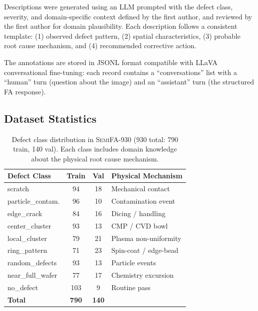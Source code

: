 \documentclass[conference]{IEEEtran}
\newcommand{\semidataset}{\textsc{SemiFA-930}}
\begin{document}
Descriptions were generated using an LLM prompted with the defect class, severity, and domain-specific context defined by the first author, and reviewed by the first author for domain plausibility.
Each description follows a consistent template: (1) observed defect pattern, (2) spatial characteristics, (3) probable root cause mechanism, and (4) recommended corrective action.

The annotations are stored in JSONL format compatible with LLaVA conversational fine-tuning: each record contains a ``conversations'' list with a ``human'' turn (question about the image) and an ``assistant'' turn (the structured FA response).

\subsection{Dataset Statistics}

\begin{table}[t]
    \centering
    \caption{Defect class distribution in \semidataset{} (930 total: 790 train, 140 val). Each class includes domain knowledge about the physical root cause mechanism.}
    \label{tab:defect_classes}
    \begin{tabular}{@{}lccl@{}}
        \toprule
        \textbf{Defect Class} & \textbf{Train} & \textbf{Val} & \textbf{Physical Mechanism} \\
        \midrule
        scratch              & 94  & 18 & Mechanical contact \\
        particle\_contam.     & 96  & 10 & Contamination event \\
        edge\_crack           & 84  & 16 & Dicing / handling \\
        center\_cluster       & 93  & 13 & CMP / CVD bowl \\
        local\_cluster        & 79  & 21 & Plasma non-uniformity \\
        ring\_pattern         & 71  & 23 & Spin-coat / edge-bead \\
        random\_defects       & 93  & 13 & Particle events \\
        near\_full\_wafer     & 77  & 17 & Chemistry excursion \\
        no\_defect            & 103 &  9 & Routine pass \\
        \midrule
        \textbf{Total}       & \textbf{790} & \textbf{140} & \\
        \bottomrule
    \end{tabular}
\end{table}
\end{document}

